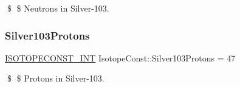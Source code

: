 \$ \$ Neutrons in Silver-\/103. \mbox{\label{group___isotope_const-_silver-_ag103_ga59fbab32259e7cba45c4a9f2bd5eafa8}} 
\subsubsection{\texorpdfstring{Silver103\+Protons}{Silver103Protons}}
{\footnotesize\ttfamily \mbox{\hyperlink{group___isotope_const-_macros_ga5f18360b3e99483a35c32d789e62621c}{I\+S\+O\+T\+O\+P\+E\+C\+O\+N\+S\+T\+\_\+\+I\+NT}} Isotope\+Const\+::\+Silver103\+Protons = 47}

\$ \$ Protons in Silver-\/103. 